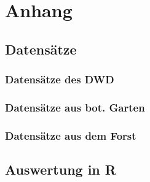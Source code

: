 \chapter{Anhang}

\section{Datensätze}
\subsection{Datensätze des DWD}
\subsection{Datensätze aus bot. Garten}
\subsection{Datensätze aus dem Forst}

\section{Auswertung in R}
